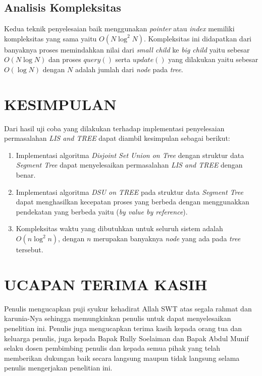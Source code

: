 \documentclass[a4paper]{IEEEtran}
\begin{document}
\subsection{Analisis Kompleksitas}
Kedua teknik penyelesaian baik menggunakan \textit{pointer} atau \textit{index} memiliki kompleksitas yang sama yaitu $O (N \log^2 N)$. Kompleksitas ini didapatkan dari banyaknya proses memindahkan nilai dari \textit{small child} ke \textit{big child} yaitu sebesar $O (N \log N)$ dan proses \textit{$query()$} serta \textit{$update()$} yang dilakukan yaitu sebesar $O (\log N)$ dengan $N$ adalah jumlah dari \textit{node} pada \textit{tree}.
\section{KESIMPULAN}
Dari hasil uji coba yang dilakukan terhadap implementasi penyelesaian permasalahan \textit{LIS and TREE} dapat diambil kesimpulan sebagai berikut:
\begin{enumerate}
	\item Implementasi algoritma \textit{Disjoint Set Union on Tree} dengan struktur data \textit{Segment Tree} dapat menyelesaikan permasalahan \textit{LIS and TREE} dengan benar.
	\item Implementasi algoritma \textit{DSU on TREE} pada struktur data \textit{Segment Tree} dapat menghasilkan kecepatan proses yang berbeda dengan menggunakkan pendekatan yang berbeda yaitu (\textit{by value \text{\&} by reference}).
	\item Kompleksitas waktu yang dibutuhkan untuk seluruh sistem adalah $O(n\log^{2}n)$, dengan $n$ merupakan banyaknya \textit{node} yang ada pada \textit{tree} tersebut.
\end{enumerate}
\section*{UCAPAN TERIMA KASIH}
Penulis mengucapkan puji syukur kehadirat Allah SWT atas segala rahmat dan karunia-Nya sehingga memungkinkan penulis untuk dapat menyelesaikan penelitian ini. Penulis juga mengucapkan terima kasih kepada orang tua dan keluarga penulis, juga kepada Bapak Rully Soelaiman dan Bapak Abdul Munif selaku dosen pembimbing penulis dan kepada semua pihak yang telah memberikan dukungan baik secara langsung maupun tidak langsung selama penulis mengerjakan penelitian ini.
\end{document}
